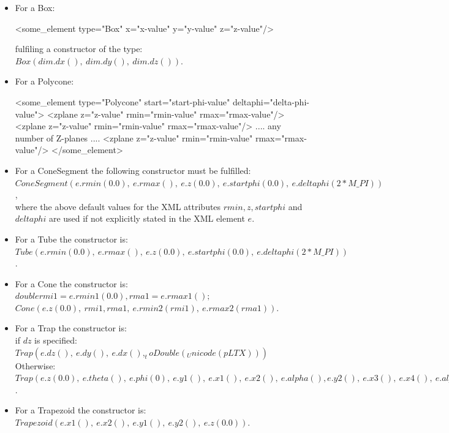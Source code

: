 \documentclass[10pt,a4paper]{article}
\begin{document}
\begin{itemize}
\item For a Box:
\vspace{-0.2cm}
\begin{unnumberedcode}
  <some_element type="Box" x="x-value" y="y-value" z="z-value"/>
\end{unnumberedcode}
fulfiling a constructor of the type: $Box(dim.dx(),~dim.dy(),~dim.dz())$.

\item For a Polycone:
\vspace{-0.2cm}
\begin{unnumberedcode}
  <some_element type="Polycone" start="start-phi-value" deltaphi="delta-phi-value">
    <zplane z="z-value" rmin="rmin-value" rmax="rmax-value"/>
    <zplane z="z-value" rmin="rmin-value" rmax="rmax-value"/>
    .... any number of Z-planes ....
    <zplane z="z-value" rmin="rmin-value" rmax="rmax-value"/>
  </some_element>
\end{unnumberedcode}

\item For a ConeSegment the following constructor must be fulfilled:\\
  $ ConeSegment(e.rmin(0.0),~e.rmax(),~e.z(0.0),~e.startphi(0.0),~e.deltaphi(2*M\_PI))$,\\
where the above default values for the XML attributes $rmin, z, startphi$ and 
$deltaphi$ are used if not explicitly stated in the XML element $e$.

\item For a Tube the constructor is:\\
  $ Tube(e.rmin(0.0),~e.rmax(),~e.z(0.0),~e.startphi(0.0),~e.deltaphi(2*M\_PI))$.

\item For a Cone the constructor is:\\
  $double rmi1 = e.rmin1(0.0), rma1 = e.rmax1();$\\
  $ Cone(e.z(0.0),~rmi1,rma1,~e.rmin2(rmi1),~e.rmax2(rma1))$.

\item For a Trap the constructor is:\\
  if $dz$ is specified: $ Trap(e.dz(),~e.dy(),~e.dx(),_toDouble(_Unicode(pLTX)))$
  Otherwise: \\
  $ Trap(e.z(0.0),~e.theta(),~e.phi(0),~e.y1(),~e.x1(),~e.x2(),~e.alpha(),
                    e.y2(),~e.x3(),~e.x4(),~e.alpha2())$.

\item For a Trapezoid the constructor is:\\
  $ Trapezoid(e.x1(),~e.x2(),~e.y1(),~e.y2(),~e.z(0.0))$.


\end{itemize}
\end{document}
